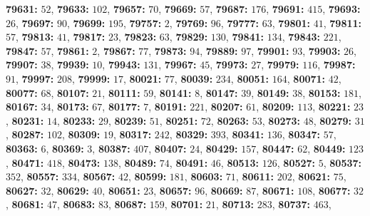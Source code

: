 \textsf{\bfseries 79631:} $52$, \textsf{\bfseries 79633:} $102$, \textsf{\bfseries 79657:} $70$, \textsf{\bfseries 79669:} $57$, \textsf{\bfseries 79687:} $176$, \textsf{\bfseries 79691:} $415$, \textsf{\bfseries 79693:} $26$, \textsf{\bfseries 79697:} $90$, \textsf{\bfseries 79699:} $195$, \textsf{\bfseries 79757:} $2$, \textsf{\bfseries 79769:} $96$, \textsf{\bfseries 79777:} $63$, \textsf{\bfseries 79801:} $41$, \textsf{\bfseries 79811:} $57$, \textsf{\bfseries 79813:} $41$, \textsf{\bfseries 79817:} $23$, \textsf{\bfseries 79823:} $63$, \textsf{\bfseries 79829:} $130$, \textsf{\bfseries 79841:} $134$, \textsf{\bfseries 79843:} $221$, \textsf{\bfseries 79847:} $57$, \textsf{\bfseries 79861:} $2$, \textsf{\bfseries 79867:} $77$, \textsf{\bfseries 79873:} $94$, \textsf{\bfseries 79889:} $97$, \textsf{\bfseries 79901:} $93$, \textsf{\bfseries 79903:} $26$, \textsf{\bfseries 79907:} $38$, \textsf{\bfseries 79939:} $10$, \textsf{\bfseries 79943:} $131$, \textsf{\bfseries 79967:} $45$, \textsf{\bfseries 79973:} $27$, \textsf{\bfseries 79979:} $116$, \textsf{\bfseries 79987:} $91$, \textsf{\bfseries 79997:} $208$, \textsf{\bfseries 79999:} $17$, \textsf{\bfseries 80021:} $77$, \textsf{\bfseries 80039:} $234$, \textsf{\bfseries 80051:} $164$, \textsf{\bfseries 80071:} $42$, \textsf{\bfseries 80077:} $68$, \textsf{\bfseries 80107:} $21$, \textsf{\bfseries 80111:} $59$, \textsf{\bfseries 80141:} $8$, \textsf{\bfseries 80147:} $39$, \textsf{\bfseries 80149:} $38$, \textsf{\bfseries 80153:} $181$, \textsf{\bfseries 80167:} $34$, \textsf{\bfseries 80173:} $67$, \textsf{\bfseries 80177:} $7$, \textsf{\bfseries 80191:} $221$, \textsf{\bfseries 80207:} $61$, \textsf{\bfseries 80209:} $113$, \textsf{\bfseries 80221:} $23$, \textsf{\bfseries 80231:} $14$, \textsf{\bfseries 80233:} $29$, \textsf{\bfseries 80239:} $51$, \textsf{\bfseries 80251:} $72$, \textsf{\bfseries 80263:} $53$, \textsf{\bfseries 80273:} $48$, \textsf{\bfseries 80279:} $31$, \textsf{\bfseries 80287:} $102$, \textsf{\bfseries 80309:} $19$, \textsf{\bfseries 80317:} $242$, \textsf{\bfseries 80329:} $393$, \textsf{\bfseries 80341:} $136$, \textsf{\bfseries 80347:} $57$, \textsf{\bfseries 80363:} $6$, \textsf{\bfseries 80369:} $3$, \textsf{\bfseries 80387:} $407$, \textsf{\bfseries 80407:} $24$, \textsf{\bfseries 80429:} $157$, \textsf{\bfseries 80447:} $62$, \textsf{\bfseries 80449:} $123$, \textsf{\bfseries 80471:} $418$, \textsf{\bfseries 80473:} $138$, \textsf{\bfseries 80489:} $74$, \textsf{\bfseries 80491:} $46$, \textsf{\bfseries 80513:} $126$, \textsf{\bfseries 80527:} $5$, \textsf{\bfseries 80537:} $352$, \textsf{\bfseries 80557:} $334$, \textsf{\bfseries 80567:} $42$, \textsf{\bfseries 80599:} $181$, \textsf{\bfseries 80603:} $71$, \textsf{\bfseries 80611:} $202$, \textsf{\bfseries 80621:} $75$, \textsf{\bfseries 80627:} $32$, \textsf{\bfseries 80629:} $40$, \textsf{\bfseries 80651:} $23$, \textsf{\bfseries 80657:} $96$, \textsf{\bfseries 80669:} $87$, \textsf{\bfseries 80671:} $108$, \textsf{\bfseries 80677:} $32$, \textsf{\bfseries 80681:} $47$, \textsf{\bfseries 80683:} $83$, \textsf{\bfseries 80687:} $159$, \textsf{\bfseries 80701:} $21$, \textsf{\bfseries 80713:} $283$, \textsf{\bfseries 80737:} $463$, 
